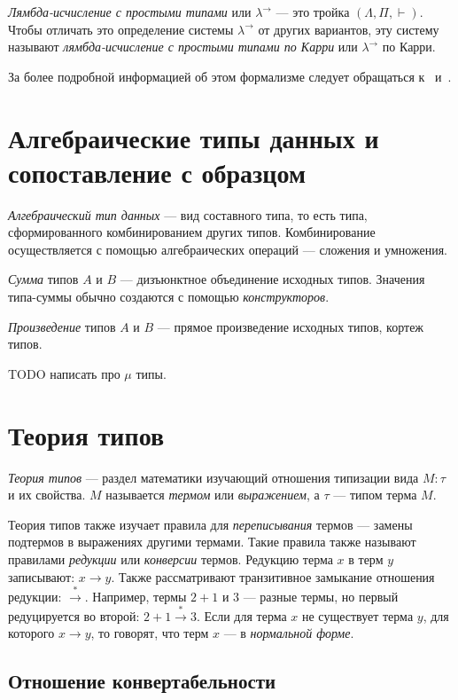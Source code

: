 \begin{definition}
    \emph{Лямбда-исчисление с простыми типами} или $\lambda^{\to}$ — это тройка
    $ (\Lambda , \Pi , \vdash) $.
    Чтобы отличать это определение системы $\lambda^{\to}$ от других вариантов,
    эту систему называют \emph{лямбда-исчисление с простыми типами по Карри} или $\lambda^{\to}$ по Карри.
\end{definition}
За более подробной информацией об этом формализме следует
обращаться к~\cite{ChurchSTLC} и~\cite{Sorensen}.

\section{Алгебраические типы данных и сопоставление с образцом}


\emph{Алгебраический тип данных} — вид составного типа, то есть типа,
сформированного комбинированием других типов.
Комбинирование осуществляется с помощью алгебраических операций — сложения и умножения.

\emph{Сумма} типов $A$ и $B$ — дизъюнктное объединение исходных типов.
Значения типа-суммы обычно создаются с помощью \emph{конструкторов}.

\emph{Произведение} типов $A$ и $B$ — прямое произведение исходных типов,
кортеж типов.

TODO написать про $\mu$ типы.
\section{Теория типов}

\emph{Теория типов} — раздел математики изучающий отношения типизации вида
$ M \colon \tau $ и их свойства. $M$ называется \emph{термом} или \emph{выражением},
а $\tau$ — типом терма $M$.

Теория типов также изучает правила для \emph{переписывания} термов — замены
подтермов в выражениях другими термами.
Такие правила также называют правилами \emph{редукции} или \emph{конверсии} термов.
Редукцию терма $x$ в терм $y$ записывают: $x \to y$.
Также рассматривают транзитивное замыкание отношения редукции: $ \xrightarrow{*} $.
Например, термы $2 + 1$ и $3$ — разные термы, но первый редуцируется во второй:
$2 + 1 \xrightarrow{*} 3$.
Если для терма $x$ не существует терма $y$, для которого $x \to y$,
то говорят, что терм $x$ — в \emph{нормальной форме}.

\subsection{Отношение конвертабельности}

